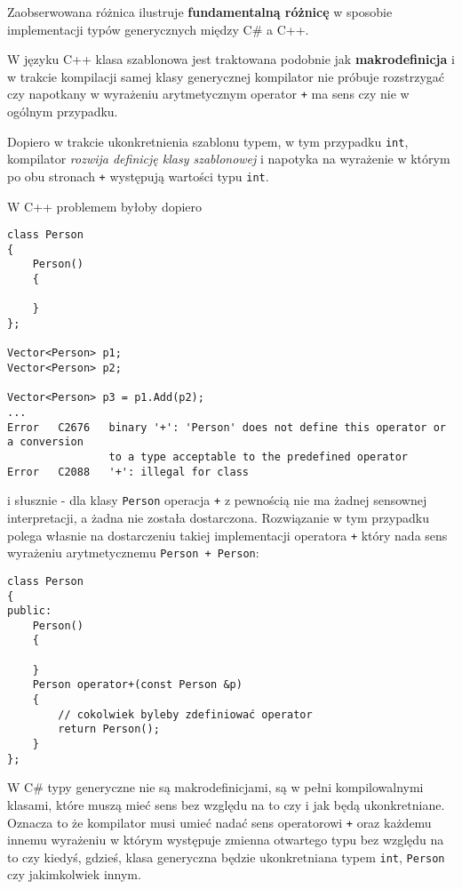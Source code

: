 Zaobserwowana różnica ilustruje {\bf fundamentalną różnicę} w sposobie implementacji typów generycznych między
C\# a C++.

W języku C++ klasa szablonowa jest traktowana podobnie jak {\bf makrodefinicja} i w trakcie kompilacji samej klasy
generycznej kompilator nie próbuje rozstrzygać czy napotkany w wyrażeniu arytmetycznym operator {\tt +}
ma sens czy nie w ogólnym przypadku.

Dopiero w trakcie ukonkretnienia szablonu typem, w tym przypadku {\tt int}, kompilator {\em rozwija definicję klasy szablonowej}
i napotyka na wyrażenie w którym po obu stronach {\tt +} występują wartości typu {\tt int}.

W C++ problemem byłoby dopiero

\begin{scriptsize}
\begin{verbatim}
class Person
{
    Person()
    {

    }
};

Vector<Person> p1;
Vector<Person> p2;

Vector<Person> p3 = p1.Add(p2);
...
Error	C2676	binary '+': 'Person' does not define this operator or a conversion 
                to a type acceptable to the predefined operator
Error	C2088	'+': illegal for class	
\end{verbatim}
\end{scriptsize}

i słusznie - dla klasy {\tt Person} operacja {\tt +} z pewnością nie ma żadnej sensownej interpretacji, a
żadna nie została dostarczona. Rozwiązanie w tym przypadku polega własnie na dostarczeniu takiej
implementacji operatora {\tt +} który nada sens wyrażeniu arytmetycznemu {\tt Person + Person}:

\begin{scriptsize}
\begin{verbatim}
class Person
{
public:
    Person()
    {

    }
    Person operator+(const Person &p) 
    {
        // cokolwiek byleby zdefiniować operator
        return Person();
    }
};
\end{verbatim}
\end{scriptsize}

W C\# typy generyczne nie są makrodefinicjami, są w pełni kompilowalnymi klasami, które muszą mieć sens 
bez względu na to czy i jak będą ukonkretniane. Oznacza to że kompilator musi umieć nadać sens operatorowi {\tt +}
oraz każdemu innemu wyrażeniu w którym występuje zmienna otwartego typu
bez względu na to czy kiedyś, gdzieś, klasa generyczna będzie ukonkretniana typem {\tt int}, {\tt Person} czy
jakimkolwiek innym.

